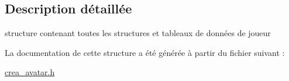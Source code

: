 \subsection{Description détaillée}
structure contenant toutes les structures et tableaux de données de joueur 

La documentation de cette structure a été générée à partir du fichier suivant \-:\begin{DoxyCompactItemize}
\item 
\hyperlink{crea__avatar_8h}{crea\-\_\-avatar.\-h}\end{DoxyCompactItemize}
